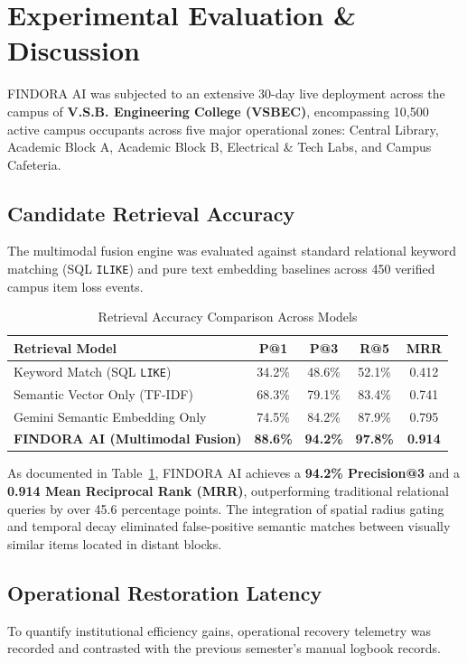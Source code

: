 \documentclass[conference]{IEEEtran}
\begin{document}
\section{Experimental Evaluation \& Discussion}

FINDORA AI was subjected to an extensive 30-day live deployment across the campus of \textbf{V.S.B. Engineering College (VSBEC)}, encompassing 10,500 active campus occupants across five major operational zones: Central Library, Academic Block A, Academic Block B, Electrical \& Tech Labs, and Campus Cafeteria.

\subsection{Candidate Retrieval Accuracy}
The multimodal fusion engine was evaluated against standard relational keyword matching (SQL \texttt{ILIKE}) and pure text embedding baselines across 450 verified campus item loss events.

\begin{table}[htbp]
\caption{Retrieval Accuracy Comparison Across Models}
\label{tab:retrieval_performance}
\centering
\setlength{\tabcolsep}{3pt}
\begin{tabular}{lcccc}
\toprule
\textbf{Retrieval Model} & \textbf{P@1} & \textbf{P@3} & \textbf{R@5} & \textbf{MRR} \\
\midrule
Keyword Match (SQL \texttt{LIKE}) & 34.2\% & 48.6\% & 52.1\% & 0.412 \\
Semantic Vector Only (TF-IDF) & 68.3\% & 79.1\% & 83.4\% & 0.741 \\
Gemini Semantic Embedding Only & 74.5\% & 84.2\% & 87.9\% & 0.795 \\
\textbf{FINDORA AI (Multimodal Fusion)} & \textbf{88.6\%} & \textbf{94.2\%} & \textbf{97.8\%} & \textbf{0.914} \\
\bottomrule
\end{tabular}
\end{table}

As documented in Table~\ref{tab:retrieval_performance}, FINDORA AI achieves a \textbf{94.2\% Precision@3} and a \textbf{0.914 Mean Reciprocal Rank (MRR)}, outperforming traditional relational queries by over 45.6 percentage points. The integration of spatial radius gating and temporal decay eliminated false-positive semantic matches between visually similar items located in distant blocks.

\subsection{Operational Restoration Latency}
To quantify institutional efficiency gains, operational recovery telemetry was recorded and contrasted with the previous semester's manual logbook records.
\end{document}

